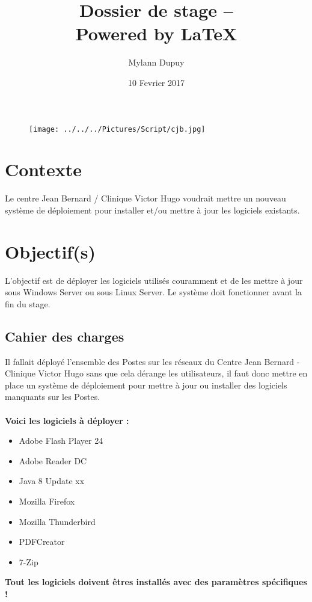 \documentclass[11pt,a4paper,oneside]{article}
\author{Mylann Dupuy}
\title{Dossier de stage --  \\ Powered by \LaTeX}
\date{10 Fevrier 2017}
\begin{document}
\maketitle
\begin{figure}[hbtp]
\centering
\texttt{[image: ../../../Pictures/Script/cjb.jpg]}
\end{figure}
\newpage
\tableofcontents
\newpage
\section{Contexte}
Le centre Jean Bernard / Clinique Victor Hugo voudrait mettre un nouveau système de déploiement pour installer et/ou mettre à jour les logiciels existants.

\section{Objectif(s)}
L'objectif est de déployer les logiciels utilisés couramment et de les mettre à jour sous Windows Server ou sous Linux Server. Le système doit fonctionner avant la fin du stage. 

\subsection{Cahier des charges}
Il fallait déployé l'ensemble des Postes sur les réseaux du Centre Jean Bernard - Clinique Victor Hugo sans que cela dérange les utilisateurs, il faut donc mettre en place un système de déploiement pour mettre à jour ou installer des logiciels manquants sur les Postes.\\ \\
\textbf{Voici les logiciels à déployer :}\\

\begin{itemize}
	\item Adobe Flash Player 24
	\item Adobe Reader DC
	\item Java 8 Update xx
	\item Mozilla Firefox
	\item Mozilla Thunderbird
	\item PDFCreator
	\item 7-Zip
\end{itemize}

\begin{center}
\textbf{Tout les logiciels doivent êtres installés avec des paramètres spécifiques !}
\end{center}
\end{document}

